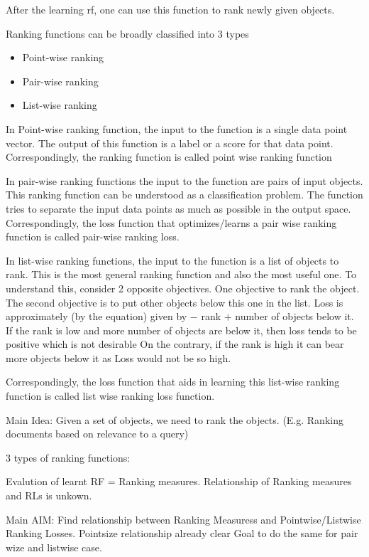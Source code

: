 \documentclass[11pt]{report}
\begin{document}
 After the learning rf,  one can use this function to rank newly given objects.

Ranking functions can be broadly classified into 3 types
\begin{itemize}
\item  Point-wise ranking
\item  Pair-wise ranking
\item  List-wise ranking
\end{itemize}

In Point-wise ranking function,  the input to the function is a single data point vector.
The output of this function is a label or a score for that data point.
Correspondingly,  the ranking function is called point wise ranking function

In pair-wise ranking functions the input to the function are pairs of input objects.
This ranking function can be understood as a classification problem. The function tries to separate the input data points as much as possible in the output space.
Correspondingly,  the loss function that optimizes/learns a pair wise ranking function is called pair-wise ranking loss.

In list-wise ranking functions,  the input to the function is a list of objects to rank. 
This is the most general ranking function and also the most useful one.
To understand this,  consider 2 opposite objectives.
One objective to rank the object.
The second objective is to put other objects below this one in the list.
Loss is approximately (by the equation) given by $-$ rank $+$ number of objects below it.
If the rank is low and more number of objects are below it,  then loss tends to be positive which is not desirable
On the contrary, if the rank is high it can bear more objects below it as Loss would not be so high.
           
Correspondingly,  the loss function that aids in learning this list-wise ranking function is called list wise ranking loss function.


\iffalse
Main Idea:
    Given a set of objects, we need to rank the objects. (E.g. Ranking documents based on relevance to a query)
    

3 types of ranking functions:


Evalution of learnt RF = Ranking measures.
Relationship of Ranking measures and RLs is unkown.


Main AIM:
    Find relationship between Ranking Measuress and Pointwise/Listwise Ranking Losses.
    Pointsize relationship already clear
    Goal to do the same for pair wize and listwise case.
\end{document}
